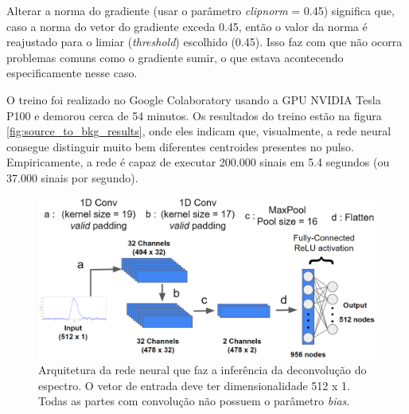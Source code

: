 \documentclass[a4paper,12pt,oneside]{book}
\begin{document}
\par Alterar a norma do gradiente (usar o parâmetro \textit{clipnorm} = 0.45) significa que, caso a norma do vetor do gradiente exceda 0.45, então o valor da norma é reajustado para o limiar (\textit{threshold}) escolhido (0.45)\cite{FORTINO2022166497}. Isso faz com que não ocorra problemas comuns como o gradiente sumir\cite{VGP, ADAMAX}, o que estava acontecendo especificamente nesse caso.

\par O treino foi realizado no Google Colaboratory \cite{google_colab} usando a GPU NVIDIA Tesla P100 e demorou cerca de 54 minutos. Os resultados do treino estão na figura \ref{fig:source_to_bkg_results}, onde eles indicam que, visualmente, a rede neural consegue distinguir muito bem diferentes centroides presentes no pulso. Empiricamente, a rede é capaz de executar 200.000 sinais em 5.4 segundos (ou 37.000 sinais por segundo).

\begin{figure}[H]
    \centering
    \includegraphics[scale = 0.28]{figs/source_wobkg_to_deconv.png}
    \caption{Arquitetura da rede neural que faz a inferência da deconvolução do espectro. O vetor de entrada deve ter dimensionalidade 512 x 1. Todas as partes com convolução não possuem o parâmetro \textit{bias}.}
    \label{fig:source_to_deconv}
\end{figure}
\end{document}
